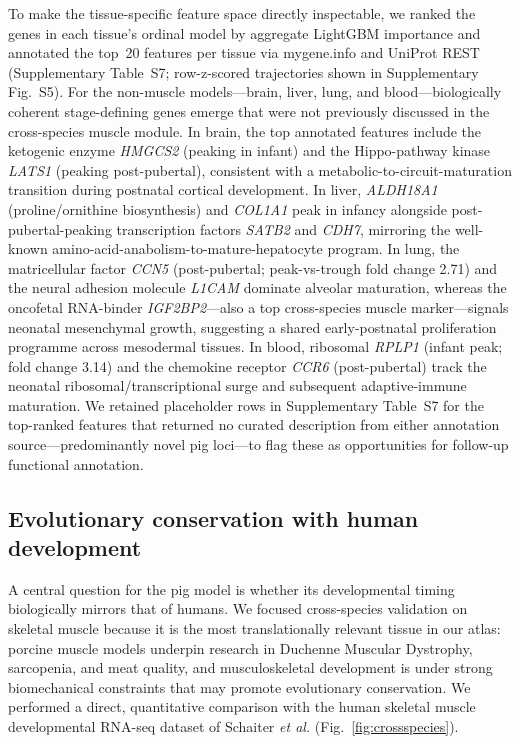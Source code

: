 \documentclass[10pt,a4paper]{article}
\newcommand{\figref}[1]{Fig.~\ref{#1}}
\begin{document}
To make the tissue-specific feature space directly inspectable, we ranked the genes in each tissue's ordinal model by aggregate LightGBM importance and annotated the top~20 features per tissue via mygene.info and UniProt REST (Supplementary Table~S7; row-z-scored trajectories shown in Supplementary Fig.~S5). For the non-muscle models---brain, liver, lung, and blood---biologically coherent stage-defining genes emerge that were not previously discussed in the cross-species muscle module. In brain, the top annotated features include the ketogenic enzyme \textit{HMGCS2} (peaking in infant) and the Hippo-pathway kinase \textit{LATS1} (peaking post-pubertal), consistent with a metabolic-to-circuit-maturation transition during postnatal cortical development. In liver, \textit{ALDH18A1} (proline/ornithine biosynthesis) and \textit{COL1A1} peak in infancy alongside post-pubertal-peaking transcription factors \textit{SATB2} and \textit{CDH7}, mirroring the well-known amino-acid-anabolism-to-mature-hepatocyte program. In lung, the matricellular factor \textit{CCN5} (post-pubertal; peak-vs-trough fold change 2.71) and the neural adhesion molecule \textit{L1CAM} dominate alveolar maturation, whereas the oncofetal RNA-binder \textit{IGF2BP2}---also a top cross-species muscle marker---signals neonatal mesenchymal growth, suggesting a shared early-postnatal proliferation programme across mesodermal tissues. In blood, ribosomal \textit{RPLP1} (infant peak; fold change 3.14) and the chemokine receptor \textit{CCR6} (post-pubertal) track the neonatal ribosomal/transcriptional surge and subsequent adaptive-immune maturation. We retained placeholder rows in Supplementary Table~S7 for the top-ranked features that returned no curated description from either annotation source---predominantly novel pig loci---to flag these as opportunities for follow-up functional annotation.

\subsection{Evolutionary conservation with human development}

A central question for the pig model is whether its developmental timing biologically mirrors that of humans. We focused cross-species validation on skeletal muscle because it is the most translationally relevant tissue in our atlas: porcine muscle models underpin research in Duchenne Muscular Dystrophy\cite{klymiuk_dystrophin-deficient_2013}, sarcopenia, and meat quality, and musculoskeletal development is under strong biomechanical constraints that may promote evolutionary conservation. We performed a direct, quantitative comparison with the human skeletal muscle developmental RNA-seq dataset of Schaiter \textit{et al.}\cite{schaiter_molecular_2024} (\figref{fig:crossspecies}).
\end{document}
